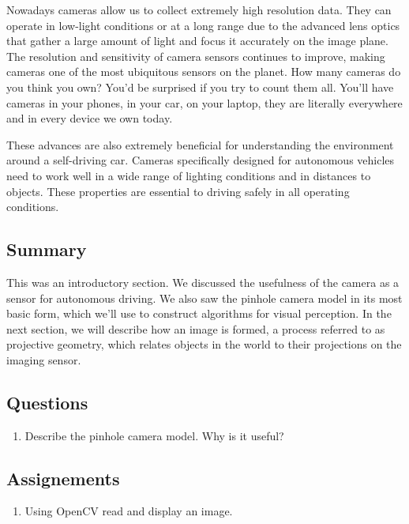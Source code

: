 Nowadays  cameras allow us to collect extremely high resolution data. They can operate in
low-light conditions or at a long range due to the advanced lens optics
that gather a large amount of light and focus it
accurately on the image plane. The resolution and sensitivity of camera sensors
continues to improve, making cameras one of the most ubiquitous sensors on the planet. How many cameras do
you think you own? You'd be surprised if you try to count them all. You'll have cameras in
your phones, in your car, on your laptop, they are literally everywhere and in every device we own today. 

These advances are also
extremely beneficial for understanding the environment
around a self-driving car.  
Cameras specifically designed for autonomous vehicles need to work well in a wide range of lighting conditions and
in distances to objects. These properties are essential to driving safely in all operating conditions. 


\subsection{Summary}

This was an introductory section. We discussed the usefulness of the camera as a sensor
for autonomous driving. We also saw the pinhole
camera model in its most basic form, which we'll use
to construct algorithms for visual perception. In the next section, we will describe how an image is formed, a process referred to
as projective geometry, which relates objects in the world to their projections on the imaging sensor.

\subsection{Questions}

\begin{enumerate}
\item Describe the pinhole camera model. Why is it useful?
\end{enumerate}

\subsection{Assignements}

\begin{enumerate}
\item Using OpenCV read and display an image.
\end{enumerate}

